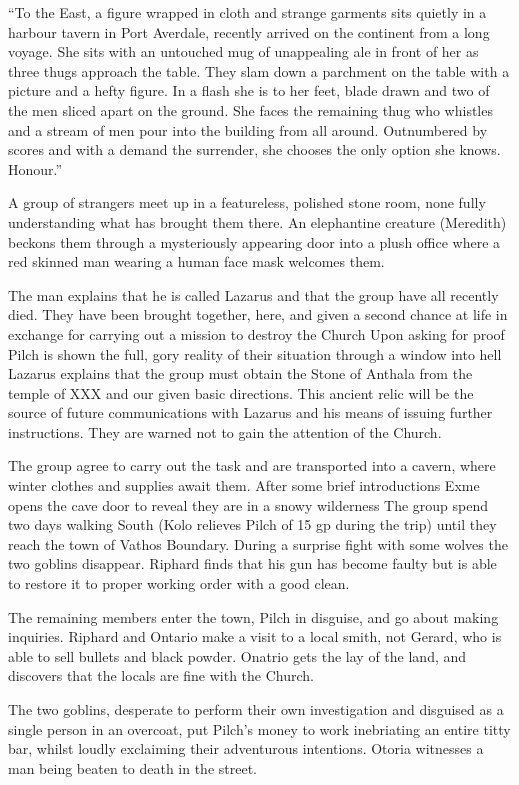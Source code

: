 \documentclass[letterpaper,10pt,twoside,twocolumn,openany]{book}
\begin{document}
“To the East, a figure wrapped in cloth and strange garments sits quietly in a harbour tavern in Port Averdale, recently arrived on the continent from a long voyage. She sits with an untouched mug of unappealing ale in front of her as three thugs approach the table. They slam down a parchment on the table with a picture and a hefty figure. In a flash she is to her feet, blade drawn and two of the men sliced apart on the ground. She faces the remaining thug who whistles and a stream of men pour into the building from all around. Outnumbered by scores and with a demand the surrender, she chooses the only option she knows. Honour.”

A group of strangers meet up in a featureless, polished stone room, none fully understanding what has brought them there. An elephantine creature (Meredith) beckons them through a mysteriously appearing door into a plush office where a red skinned man wearing a human face mask welcomes them.

The man explains that he is called Lazarus and that the group have all recently died. They have been brought together, here, and given a second chance at life in exchange for carrying out a mission to destroy the Church Upon asking for proof Pilch is shown the full, gory reality of their situation through a window into hell Lazarus explains that the group must obtain the Stone of Anthala from the temple of XXX and our given basic directions. This ancient relic will be the source of future communications with Lazarus and his means of issuing further instructions. They are warned not to gain the attention of the Church.

The group agree to carry out the task and are transported into a cavern, where winter clothes and supplies await them. After some brief introductions Exme opens the cave door to reveal they are in a snowy wilderness The group spend two days walking South (Kolo relieves Pilch of 15 gp during the trip) until they reach the town of Vathos Boundary. During a surprise fight with some wolves the two goblins disappear. Riphard finds that his gun has become faulty but is able to restore it to proper working order with a good clean.

The remaining members enter the town, Pilch in disguise, and go about making inquiries. Riphard and Ontario make a visit to a local smith, not Gerard, who is able to sell bullets and black powder. Onatrio gets the lay of the land, and discovers that the locals are fine with the Church.

The two goblins, desperate to perform their own investigation and disguised as a single person in an overcoat, put Pilch’s money to work inebriating an entire titty bar, whilst loudly exclaiming their adventurous intentions. Otoria witnesses a man being beaten to death in the street.
\end{document}
